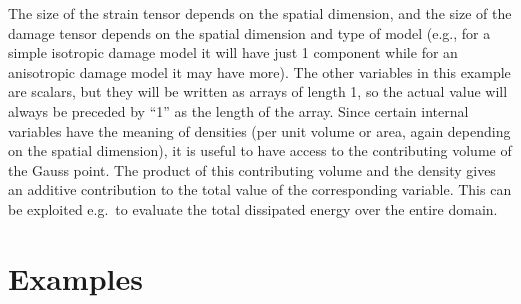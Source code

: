 \documentclass[a4paper]{report}
\begin{document}
\begin{itemize}
The size of the strain tensor depends on the spatial dimension, and the size
of the damage tensor depends on the spatial dimension and type of model
(e.g., for a simple isotropic damage model it will have just 1 component
while for an anisotropic damage model it may have more). The other variables
in this example are scalars, but they will be written as arrays of length 1,
so the actual value will always be preceded by ``1'' as the length of the array. Since certain internal variables have the meaning of densities (per unit volume
or area, again depending on the spatial dimension), it is useful to have
access to the contributing volume  of the Gauss point. The product of this
contributing volume and the density gives an additive contribution to the
total value of the corresponding variable. This can be exploited e.g.\ to
evaluate the total dissipated energy over the entire domain.
\end{itemize}




\clearpage
\chapter{Examples}
\end{document}
